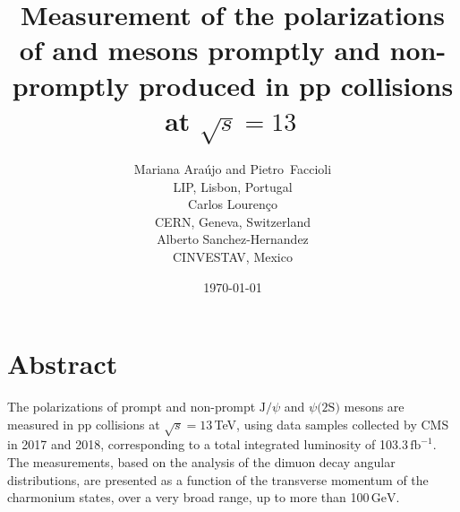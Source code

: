 \documentclass{article}
\title{Measurement of the polarizations of \jpsi and \psip mesons promptly and non-promptly produced in pp collisions at $\sqrt{s} = 13$\,\TeV}
\author{Mariana Ara{\'u}jo and Pietro~Faccioli\\
LIP, Lisbon, Portugal\\[5mm]
Carlos Louren\c{c}o\\
CERN, Geneva, Switzerland\\[5mm]
Alberto Sanchez-Hernandez\\ 
CINVESTAV, Mexico}
\date{\today}
\newcommand{\fbinv}{\ensuremath{\text{fb}^{-1}}\xspace}
\newcommand{\GeV}{\ensuremath{\text{GeV}}\xspace}
\newcommand{\jpsi}{\ensuremath{\text{J/}\psi}\xspace}
\newcommand{\psip}{\ensuremath{\psi\text{(2S)}}\xspace}
\begin{document}
\maketitle

\section*{Abstract}

The polarizations of prompt and non-prompt \jpsi and \psip mesons are measured in pp collisions at $\sqrt{s} = 13$\,TeV, using data samples collected by CMS in 2017 and 2018, corresponding to a total integrated luminosity of 103.3\,\fbinv. The measurements, based on the analysis of the dimuon decay angular distributions, are presented as a function of the transverse momentum of the charmonium states, over a very broad range, up to more than 100\,\GeV.

\pagebreak

\tableofcontents


\pagebreak












\end{document}
